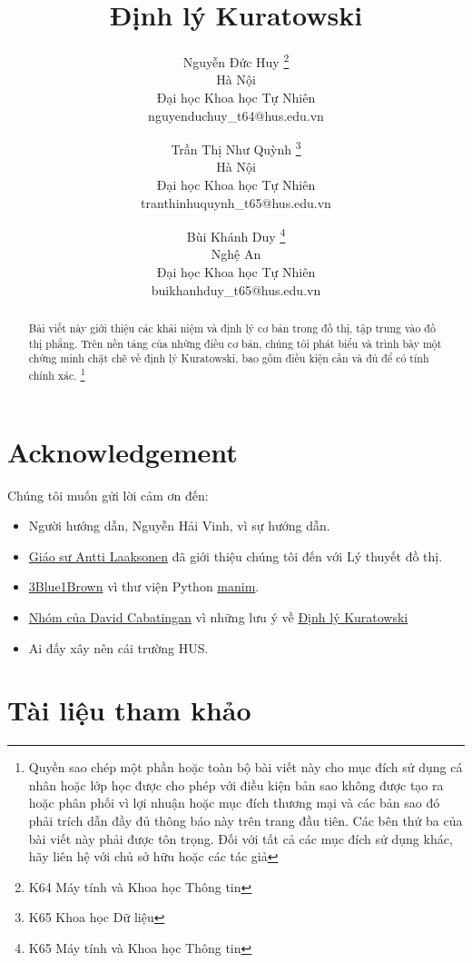 \documentclass[12pt]{article}
\title{\textbf{Định lý Kuratowski}}
\author{
    Nguyễn Đức Huy \thanks{K64 Máy tính và Khoa học Thông tin}\\
    Hà Nội \\
    Đại học Khoa học Tự Nhiên \\
    nguyenduchuy\_t64@hus.edu.vn
    \and
    Trần Thị Như Quỳnh \thanks{K65 Khoa học Dữ liệu} \\
    Hà Nội \\
    Đại học Khoa học Tự Nhiên \\
    tranthinhuquynh\_t65@hus.edu.vn
    \and
    Bùi Khánh Duy \thanks{K65 Máy tính và Khoa học Thông tin}\\
    Nghệ An \\
    Đại học Khoa học Tự Nhiên \\
    buikhanhduy\_t65@hus.edu.vn
}
\begin{document}
\begin{titlepage}
    \maketitle
    \begin{abstract}
        Bài viết này giới thiệu các khái niệm và định lý cơ bản trong đồ thị, tập trung vào đồ thị phẳng. Trên nền tảng của những điều cơ bản, chúng tôi phát biểu và trình bày một chứng minh chặt chẽ về định lý Kuratowski, bao gồm điều kiện cần và đủ để có tính chính xác. \footnote{Quyền sao chép một phần hoặc toàn bộ bài viết này cho mục đích sử dụng cá nhân hoặc lớp học được cho phép với điều kiện bản sao không được tạo ra hoặc phân phối vì lợi nhuận hoặc mục đích thương mại và các bản sao đó phải trích dẫn đầy đủ thông báo này trên trang đầu tiên. Các bên thứ ba của bài viết này phải được tôn trọng. Đối với tất cả các mục đích sử dụng khác, hãy liên hệ với chủ sở hữu hoặc các tác giả}
    \end{abstract}
\end{titlepage}

\begin{titlepage}
    \tableofcontents
\end{titlepage}







\section*{Acknowledgement}
Chúng tôi muốn gửi lời cảm ơn đến:
\begin{itemize}
    \item Người hướng dẫn, Nguyễn Hải Vinh, vì sự hướng dẫn.
    \item \href{https://cses.fi/book/book.pdf}{Giáo sư Antti Laaksonen} đã giới thiệu chúng tôi đến với Lý thuyết đồ thị.
    \item \href{https://www.youtube.com/channel/UCYO_jab_esuFRV4b17AJtAw}{3Blue1Brown} vì thư viện Python \href{https://github.com/dcabatin/manim}{manim}.
    \item \href{https://www.youtube.com/watch?v=DOnY6eZi2E8}{Nhóm của David Cabatingan} vì những lưu ý về \hyperref[thr:kuratowski]{Định lý Kuratowski}
    \item Ai đấy xây nên cái trường HUS.
\end{itemize}
\section*{Tài liệu tham khảo}
\end{document}
